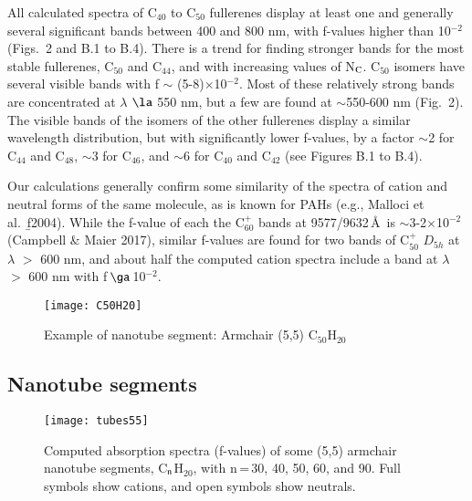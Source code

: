\documentclass{aa}
\begin{document}
All calculated spectra of C$_{40}$ to C$_{50}$ fullerenes display at least one and generally several significant bands between 400 and 800 nm, with f-values higher than 10$^{-2}$ (Figs.\ 2 and B.1 to B.4). There is a trend for finding stronger bands for the most stable fullerenes, C$_{50}$ and C$_{44}$, and with increasing values of N$_{\rm C}$. C$_{50}$ isomers have several visible bands with f $\sim$ (5-8)$\times$10$^{-2}$. Most of these relatively strong bands are concentrated at $\lambda$ $\la$ 550 nm, 
but a few are found at $\sim$550-600 nm (Fig.\ 2). The visible bands of the isomers of the other fullerenes display a similar wavelength distribution, but with significantly lower f-values, by a factor $\sim$2 for C$_{44}$ and C$_{48}$, $\sim$3 for C$_{46}$, and  $\sim$6 for C$_{40}$ and  C$_{42}$ (see Figures B.1 to B.4). 

Our calculations  generally confirm some similarity of the spectra of cation and neutral forms of the same molecule, as is known for PAHs (e.g., Malloci et al.\ {\b f2004).}
While the f-value of each the C$_{60}^+$ bands at 9577/9632\,\AA\  is $\sim$3-2$\times$10$^{-2}$ (Campbell \& Maier 2017), similar f-values are found for two bands of C$_{50}^+$ $D_{5h}$ at $\lambda$ $>$ 600 nm, and about half the computed cation spectra include a band at $\lambda$ $>$ 600 nm with f\,$\ga$\,10$^{-2}$.

\begin{figure}[htbp]
         \begin{center}
\texttt{[image: C50H20]}
 \caption{Example of nanotube segment: Armchair (5,5) C$_{50}$H$_{20}$}
     \end{center}
 \end{figure}

\subsection{Nanotube segments}

\begin{figure}[htbp]
         \begin{center}
\texttt{[image: tubes55]}
 \caption{Computed absorption spectra (f-values) of some (5,5) armchair nanotube segments, C$_{\rm n}$H$_{20}$, with n\,=\,30, 40, 50, 60, and  90. Full symbols show cations, and open symbols show neutrals.}
     \end{center}
 \end{figure}
\end{document}
